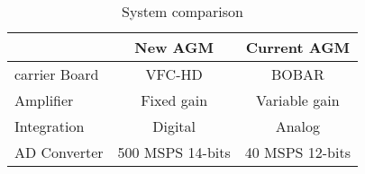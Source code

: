 \begin{table}[!hbt]
   \centering
   \begin{tabular}{| l | c | c |}
       \hline
       & \textbf{New AGM} & \textbf{Current AGM} \\
       \hline
        carrier Board & VFC-HD & BOBAR \\
       \hline
        Amplifier & Fixed gain & Variable gain \\
       \hline
        Integration & Digital & Analog \\
        \hline
        AD Converter & 500 MSPS 14-bits & 40 MSPS 12-bits \\
        \hline
   \end{tabular}
   \caption{System comparison}
   \label{tab:system_comparison}
\end{table}
